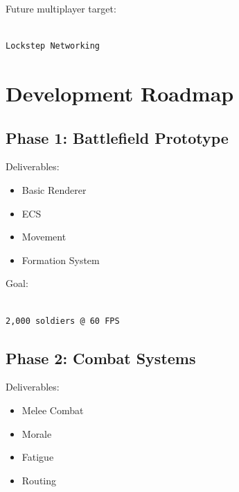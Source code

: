 \documentclass[11pt,a4paper]{article}
\begin{document}
Future multiplayer target:

\begin{verbatim}

Lockstep Networking

\end{verbatim}

\section{Development Roadmap}

\subsection{Phase 1: Battlefield Prototype}

Deliverables:

\begin{itemize}

    \item Basic Renderer

    \item ECS

    \item Movement

    \item Formation System

\end{itemize}

Goal:

\begin{verbatim}

2,000 soldiers @ 60 FPS

\end{verbatim}

\subsection{Phase 2: Combat Systems}

Deliverables:

\begin{itemize}

    \item Melee Combat

    \item Morale

    \item Fatigue

    \item Routing

\end{itemize}
\end{document}
